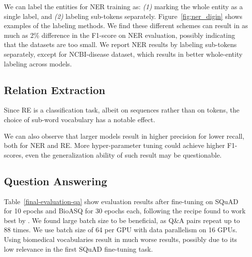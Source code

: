 \documentclass[11pt,a4paper]{article}
\begin{document}
\begin{table}
\centering
{}
\caption{\label{word-breakout-rate}The rate of named entities breaking into subtokens (\#tokens/\#words) in NER training sets.}
\end{table}

We can label the entities for NER training as: \textit{(1)} marking the whole entity as a single label, and \textit{(2)} labeling sub-tokens separately.
Figure~\ref{fig:ner_digin} shows examples of the labeling methods.
We find these different schemes can result in as much as 2\% difference in the F1-score on NER evaluation, possibly indicating that the datasets are too small.
We report NER results by labeling sub-tokens separately, except for NCBI-disease dataset, which results in better whole-entity labeling across models.



\subsection{Relation Extraction}

Since RE is a classification task, albeit on sequences rather than on tokens, the choice of sub-word vocabulary has a notable effect.

We can also observe that larger models result in higher precision for lower recall, both for NER and RE.
More hyper-parameter tuning could achieve higher F1-scores, even the generalization ability of such result may be questionable.

\subsection{Question Answering}

Table~\ref{final-evaluation-qa} show evaluation results after fine-tuning on SQuAD for 10 epochs and BioASQ for 30 epochs each, following the recipe found to work best by \citet{lee2019biobert}.
We found large batch size to be beneficial, as Q\&A pairs repeat up to 88 times.
We use batch size of 64 per GPU with data parallelism on 16 GPUs.
Using biomedical vocabularies result in much worse results, possibly due to its low relevance in the first SQuAD fine-tuning task.
\end{document}
